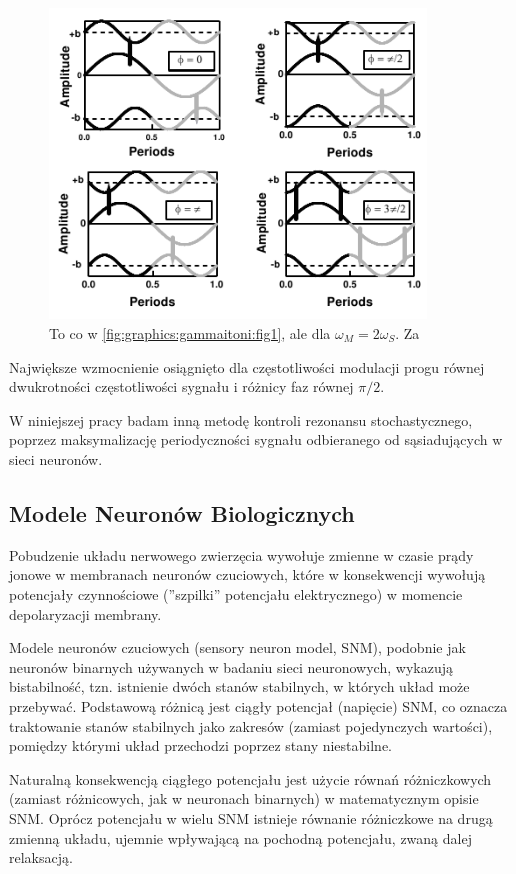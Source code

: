   \begin{figure}
    \includegraphics[width=100mm]{images/gammaitoni_2.png}
    \caption{To co w \ref{fig:graphics:gammaitoni:fig1}, ale dla $\omega_M = 2 \omega_S$. Za \cite{gammaitoni}}
    \label{fig:graphics:gammaitoni:fig2}
  \end{figure}

  Największe wzmocnienie osiągnięto dla częstotliwości modulacji progu równej dwukrotności częstotliwości sygnału i różnicy faz równej $\pi/2$.

  W niniejszej pracy badam inną metodę kontroli rezonansu stochastycznego, poprzez maksymalizację periodyczności sygnału odbieranego od sąsiadujących w sieci neuronów.
  
  \subsection{Modele Neuronów Biologicznych}
  
  Pobudzenie układu nerwowego zwierzęcia wywołuje zmienne w czasie prądy jonowe w membranach neuronów czuciowych, które w konsekwencji wywołują potencjały czynnościowe (''szpilki'' potencjału elektrycznego) w momencie depolaryzacji membrany.
  
  Modele neuronów czuciowych (sensory neuron model, SNM), podobnie jak neuronów binarnych używanych w badaniu sieci neuronowych, wykazują bistabilność, tzn. istnienie dwóch stanów stabilnych, w których układ może przebywać. Podstawową różnicą jest ciągły potencjał (napięcie) SNM, co oznacza traktowanie stanów stabilnych jako zakresów (zamiast pojedynczych wartości), pomiędzy którymi układ przechodzi poprzez stany niestabilne. 
  
  Naturalną konsekwencją ciągłego potencjału jest użycie równań różniczkowych (zamiast różnicowych, jak w neuronach binarnych) w matematycznym opisie SNM. Oprócz potencjału w wielu SNM istnieje równanie różniczkowe na drugą zmienną układu, ujemnie wpływającą na pochodną potencjału, zwaną dalej relaksacją.
  
